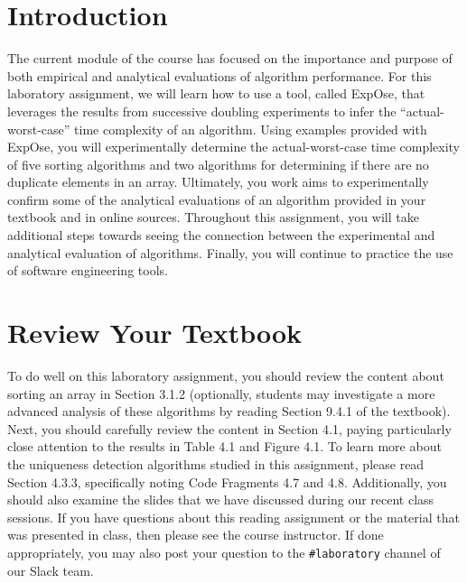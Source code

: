

\usepackage[compact]{titlesec}


\section*{Introduction}

The current module of the course has focused on the importance and purpose of both empirical and analytical evaluations
of algorithm performance. For this laboratory assignment, we will learn how to use a tool, called {\sc ExpOse}, that
leverages the results from successive doubling experiments to infer the ``actual-worst-case'' time complexity of an
algorithm. Using examples provided with {\sc ExpOse}, you will experimentally determine the actual-worst-case time
complexity of five sorting algorithms and two algorithms for determining if there are no duplicate elements in an
array. Ultimately, you work aims to experimentally confirm some of the analytical evaluations of an algorithm provided
in your textbook and in online sources. Throughout this assignment, you will take additional steps towards seeing the
connection between the experimental and analytical evaluation of algorithms. Finally, you will continue to practice the
use of software engineering tools.

\section*{Review Your Textbook}

To do well on this laboratory assignment, you should review the content about sorting an array in Section 3.1.2
(optionally, students may investigate a more advanced analysis of these algorithms by reading Section 9.4.1 of the
textbook). Next, you should carefully review the content in Section 4.1, paying particularly close attention to the
results in Table 4.1 and Figure 4.1. To learn more about the uniqueness detection algorithms studied in this assignment,
please read Section 4.3.3, specifically noting Code Fragments 4.7 and 4.8.  Additionally, you should also examine the
slides that we have discussed during our recent class sessions. If you have questions about this reading assignment or
the material that was presented in class, then please see the course instructor. If done appropriately, you may also
post your question to the {\tt \#laboratory} channel of our Slack team.

